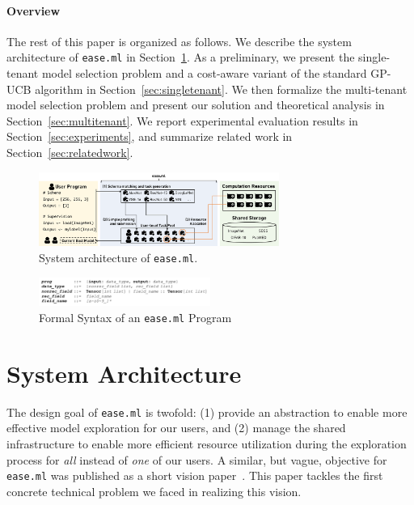 \documentclass[letterpaper]{vldb}
\newcommand{\eml}{\texttt{ease.ml}\xspace}
\begin{document}
\vspace{-0.5em}
\paragraph*{Overview}
The rest of this paper is organized as follows.
We describe the system architecture of \eml in Section~\ref{sec:architecture}.
As a preliminary, we present the single-tenant model selection problem and a cost-aware variant of the standard GP-UCB algorithm in Section~\ref{sec:singletenant}.
We then formalize the multi-tenant model selection problem and present our solution and theoretical analysis in Section~\ref{sec:multitenant}.
We report experimental evaluation results in Section~\ref{sec:experiments}, and summarize related work in Section~\ref{sec:relatedwork}.





\begin{figure}
\centering
\includegraphics[width=0.7\textwidth]{figures/easeml}
\vspace{-1em}
\caption{System architecture of \texttt{ease.ml}.}
\label{fig:architecture}
\vspace{-1em}
\end{figure}


\begin{figure}[t]
\centering
\includegraphics[width=0.5\textwidth]{figures/syntax}
\vspace{-3em}
\caption{Formal Syntax of an \eml Program}
\label{fig:syntax}
\vspace{-2em}
\end{figure}


\newpage
\vspace{-1em}
\section{System Architecture} \label{sec:architecture}

The design goal of \eml is twofold: (1) provide an abstraction
to enable more effective model exploration for our users, and 
(2) manage the shared infrastructure to enable more efficient
resource utilization during the exploration process 
for {\em all} instead of {\em one} of our users.
A similar, but vague, objective for \eml was published as a short vision paper~\cite{Zhang2017a}. This paper tackles the first
concrete technical problem we faced in realizing this
vision.
\end{document}
